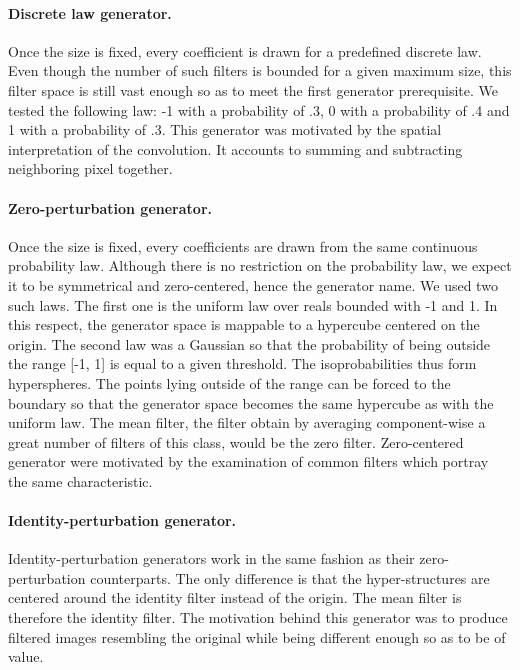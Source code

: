\documentclass[a4paper]{report}
\begin{document}
			\paragraph{Discrete law generator.}
			Once the size is fixed, every coefficient is drawn for a predefined discrete law. Even though the number of such filters is bounded for a given maximum size, this filter space is still vast enough so as to meet the first generator prerequisite. We tested the following law: -1 with a probability of .3, 0 with a probability of .4 and 1 with a probability of .3.
			This generator was motivated by the spatial interpretation of the convolution. It accounts to summing and subtracting neighboring pixel together.
			
			\paragraph{Zero-perturbation generator.}
			Once the size is fixed, every coefficients are drawn from the same continuous probability law. Although there is no restriction on the probability law, we expect it to be symmetrical and zero-centered, hence the generator name. We used two such laws. The first one is the uniform law over reals bounded with -1 and 1. In this respect, the generator space is mappable to a hypercube centered on the origin. The second law was a Gaussian so that the probability of being outside the range [-1, 1] is equal to a given threshold. The isoprobabilities thus form hyperspheres. The points lying outside of the range can be forced to the boundary so that the generator space becomes the same hypercube as with the uniform law.
			The mean filter, the filter obtain by averaging component-wise a great number of filters of this class, would be the zero filter.
			Zero-centered generator were motivated by the examination of common filters which portray the same characteristic.
			
			\paragraph{Identity-perturbation generator.}
			Identity-perturbation generators work in the same fashion as their zero-perturbation counterparts. The only difference is that the hyper-structures are centered around the identity filter instead of the origin. The mean filter is therefore the identity filter.
			The motivation behind this generator was to produce filtered images resembling the original while being different enough so as to be of value.
			
\end{document}
